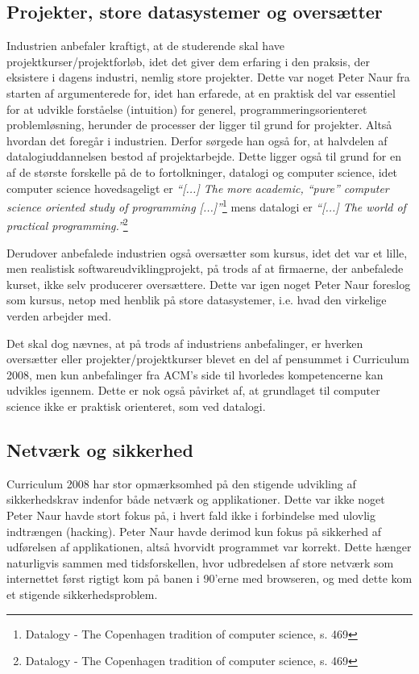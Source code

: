 \documentclass[10pt,a4paper]{article}
\newcommand{\citat}[2]{\vspace{0.2cm}\newline\textit{``#1''}\hspace{0.1cm}\footnote{#2}\vspace{0.2cm}\newline}
\begin{document}
\subsection{Projekter, store datasystemer og oversætter}
Industrien anbefaler kraftigt, at de studerende skal have projektkurser/projektforløb, idet det giver dem erfaring i den praksis, der eksistere i dagens industri, nemlig store projekter. Dette var noget Peter Naur fra starten af argumenterede for, idet han erfarede, at en praktisk del var essentiel for at udvikle forståelse (intuition) for generel, programmeringsorienteret problemløsning, herunder de processer der ligger til grund for projekter. Altså hvordan det foregår i industrien. Derfor sørgede han også for, at halvdelen af datalogiuddannelsen bestod af projektarbejde. Dette ligger også til grund for en af de største forskelle på de to fortolkninger, datalogi og computer science, idet computer science hovedsageligt er 
\citat{[...] The more academic, ``pure'' computer science oriented study of programming [...]}{Datalogy - The Copenhagen tradition of computer science, s. 469} 
mens datalogi er 
\citat{[...] The world of practical programming.}{Datalogy - The Copenhagen tradition of computer science, s. 469}

Derudover anbefalede industrien også oversætter som kursus, idet det var et lille, men realistisk softwareudviklingprojekt, på trods af at firmaerne, der anbefalede kurset, ikke selv producerer oversættere. Dette var igen noget Peter Naur foreslog som kursus, netop med henblik på store datasystemer, i.e. hvad den virkelige verden arbejder med.

Det skal dog nævnes, at på trods af industriens anbefalinger, er hverken oversætter eller projekter/projektkurser blevet en del af pensummet i Curriculum 2008, men kun anbefalinger fra ACM's side til hvorledes kompetencerne kan udvikles igennem. Dette er nok også påvirket af, at grundlaget til computer science ikke er praktisk orienteret, som ved datalogi.

\subsection{Netværk og sikkerhed}
Curriculum 2008 har stor opmærksomhed på den stigende udvikling af sikkerhedskrav indenfor både netværk og applikationer. Dette var ikke noget Peter Naur havde stort fokus på, i hvert fald ikke i forbindelse med ulovlig indtrængen (hacking). Peter Naur havde derimod kun fokus på sikkerhed af udførelsen af applikationen, altså hvorvidt programmet var korrekt. Dette hænger naturligvis sammen med tidsforskellen, hvor udbredelsen af store netværk som internettet først rigtigt kom på banen i 90'erne med browseren, og med dette kom et stigende sikkerhedsproblem.
\end{document}
